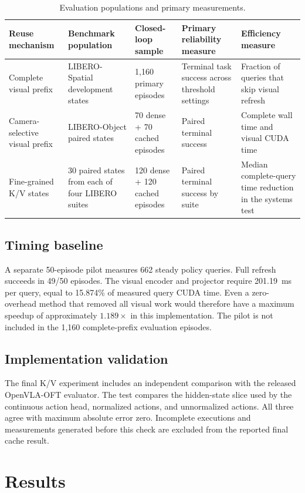 \documentclass[journal]{IEEEtran}
\begin{document}
\begin{table}[t]
\caption{Evaluation populations and primary measurements.}
\label{tab:protocol}
\centering
\footnotesize
\begin{tabularx}{\textwidth}{@{}L{3.4cm}L{3.0cm}L{3.2cm}YL{3.1cm}@{}}
\toprule
Reuse mechanism & Benchmark population & Closed-loop sample & Primary reliability measure & Efficiency measure \\
\midrule
Complete visual prefix & LIBERO-Spatial development states & 1,160 primary episodes & Terminal task success across threshold settings & Fraction of queries that skip visual refresh \\
Camera-selective visual prefix & LIBERO-Object paired states & 70 dense + 70 cached episodes & Paired terminal success & Complete wall time and visual CUDA time \\
Fine-grained K/V states & 30 paired states from each of four LIBERO suites & 120 dense + 120 cached episodes & Paired terminal success by suite & Median complete-query time reduction in the systems test \\
\bottomrule
\end{tabularx}
\end{table}

\subsection{Timing baseline}
A separate 50-episode pilot measures 662 steady policy queries. Full refresh succeeds in 49/50 episodes. The visual encoder and projector require 201.19~ms per query, equal to 15.874\% of measured query CUDA time. Even a zero-overhead method that removed all visual work would therefore have a maximum speedup of approximately $1.189\times$ in this implementation. The pilot is not included in the 1,160 complete-prefix evaluation episodes.

\subsection{Implementation validation}
The final K/V experiment includes an independent comparison with the released OpenVLA-OFT evaluator. The test compares the hidden-state slice used by the continuous action head, normalized actions, and unnormalized actions. All three agree with maximum absolute error zero. Incomplete executions and measurements generated before this check are excluded from the reported final cache result.

\section{Results}
\end{document}
